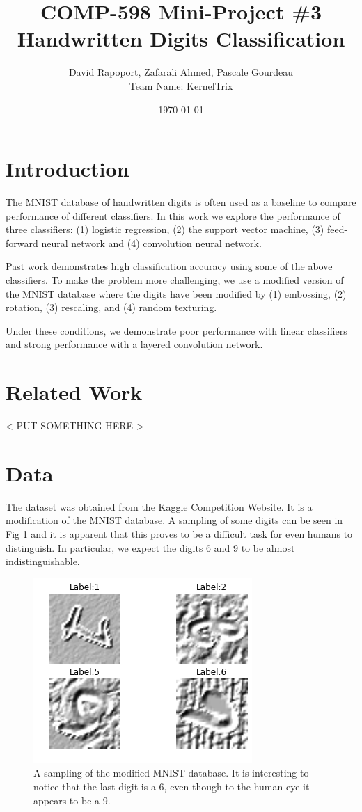 \documentclass[conference]{IEEEtran}
\author{David Rapoport, Zafarali Ahmed, Pascale Gourdeau\\Team Name: KernelTrix}
\title{COMP-598 Mini-Project \#3\\Handwritten Digits Classification}
\date{\today}
\begin{document}
\maketitle

\section{Introduction}
The MNIST database\cite{MNIST_Original} of handwritten digits is often used as a baseline to compare performance of different classifiers. In this work we explore the performance of three classifiers: (1) logistic regression, (2) the support vector machine, (3) feed-forward neural network and (4) convolution neural network. 

Past work \cite{MNIST_Original} demonstrates high classification accuracy using some of the above classifiers. To make the problem more challenging, we use a modified version of the MNIST database where the digits have been modified by (1) embossing, (2) rotation, (3) rescaling, and (4) random texturing.

Under these conditions, we demonstrate poor performance with linear classifiers and strong performance with a layered convolution network.



\section{Related Work}
< PUT SOMETHING HERE >



\section{Data}

The dataset was obtained from the Kaggle Competition Website. It is a modification of the MNIST \cite{MNIST_Original} database. A sampling of some digits can be seen in Fig \ref{MNISTSample} and it is apparent that this proves to be a difficult task for even humans to distinguish. In particular, we expect the digits $6$ and $9$ to be almost indistinguishable.

\begin{figure}[h]
		\label{MNISTSample}
	\centering
	\includegraphics[scale=0.50]{sample_of_images.png}
	\caption{A sampling of the modified MNIST database. It is interesting to notice that the last digit is a 6, even though to the human eye it appears to be a 9.}
\end{figure}
\end{document}
